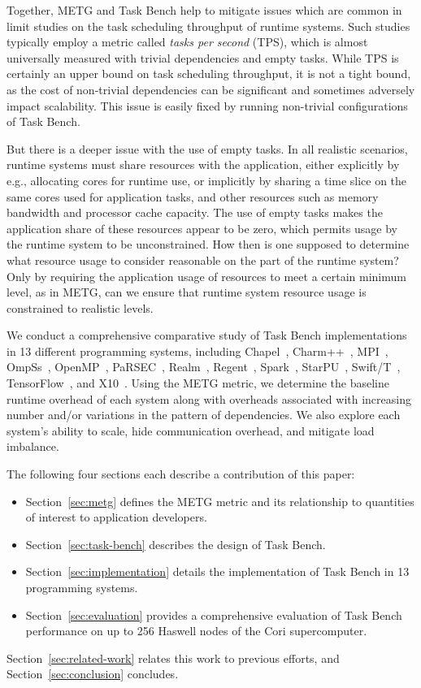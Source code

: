 Together, METG and Task Bench help to mitigate issues which are common
in limit studies on the task scheduling throughput of runtime
systems. Such studies typically employ a metric called \emph{tasks per
  second} (TPS), which is almost universally measured with trivial
dependencies and empty tasks. While TPS is certainly an upper bound on
task scheduling throughput, it is not a tight bound, as the cost of
non-trivial dependencies can be significant and sometimes adversely
impact scalability. This issue is easily fixed by running non-trivial
configurations of Task Bench.

But there is a deeper issue with the use of empty tasks. In all
realistic scenarios, runtime systems must share resources with the
application, either explicitly by e.g., allocating cores for runtime
use, or implicitly by sharing a time slice on the same cores used for
application tasks, and other resources such as memory bandwidth and
processor cache capacity. The use of empty tasks makes the application
share of these resources appear to be zero, which permits usage by the
runtime system to be unconstrained. How then is one supposed to
determine what resource usage to consider reasonable on the part of
the runtime system? Only by requiring the application usage of
resources to meet a certain minimum level, as in METG, can we ensure
that runtime system resource usage is constrained to realistic levels.

We conduct a comprehensive comparative study of Task Bench
implementations in 13 different programming systems, including
Chapel~\cite{Chapel07}, Charm++~\cite{Charmpp93}, MPI~\cite{MPI},
OmpSs~\cite{OmpSs11}, OpenMP~\cite{OpenMPSpec40},
PaRSEC~\cite{PARSEC13}, Realm~\cite{Realm14}, Regent~\cite{Regent15},
Spark~\cite{Spark10}, StarPU~\cite{StarPU11},
Swift/T~\cite{Wozniak13}, TensorFlow~\cite{TensorFlow15}, and
X10~\cite{X1005}. Using the METG metric, we determine the baseline
runtime overhead of each system along with overheads associated with
increasing number and/or variations in the pattern of dependencies. We
also explore each system's ability to scale, hide communication
overhead, and mitigate load imbalance.

The following four sections each describe a contribution of this
paper:

\begin{itemize}
\item Section~\ref{sec:metg} defines the METG metric and its
  relationship to quantities of interest to application developers.
\item Section~\ref{sec:task-bench} describes the design of Task Bench.
\item Section~\ref{sec:implementation} details the implementation of
  Task Bench in 13 programming systems.
\item Section~\ref{sec:evaluation} provides a comprehensive evaluation
  of Task Bench performance on up to 256 Haswell nodes of the Cori
  supercomputer.
\end{itemize}

Section~\ref{sec:related-work} relates this work to previous efforts,
and Section~\ref{sec:conclusion} concludes.
